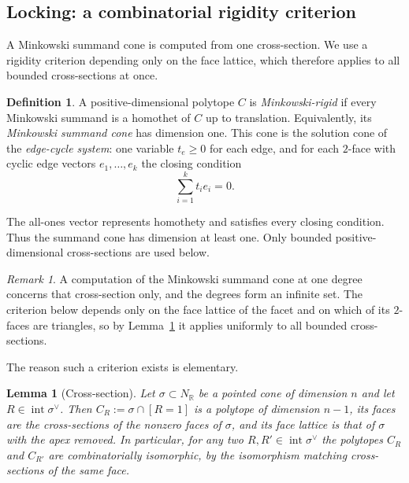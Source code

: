 \documentclass[11pt]{amsart}
\newtheorem{lemma}[theorem]{Lemma}
\theoremstyle{definition}
\newtheorem{definition}[theorem]{Definition}
\theoremstyle{remark}
\newtheorem{remark}[theorem]{Remark}
\theoremstyle{plain}
\newcommand{\RR}{\mathbb{R}}
\begin{document}
\subsection{Locking: a combinatorial rigidity criterion}

A Minkowski summand cone is computed from one cross-section.  We use a
rigidity criterion depending only on the face lattice, which therefore applies
to all bounded cross-sections at once.

\begin{definition}\label{def:rigid}
A positive-dimensional polytope $C$ is \emph{Minkowski-rigid} if every
Minkowski summand is a homothet of $C$ up to translation.  Equivalently,
its \emph{Minkowski summand cone} has dimension one.  This cone is the
solution cone of the \emph{edge-cycle system}: one variable $t_e\ge0$
for each edge, and for each $2$-face with cyclic edge vectors
$e_1,\ldots,e_k$ the closing condition
\begin{equation}\label{eq:closing}
  \sum_{i=1}^k t_i e_i=0.
\end{equation}
\end{definition}

The all-ones vector represents homothety and satisfies every closing
condition.  Thus the summand cone has dimension at least one.
Only bounded positive-dimensional cross-sections are used below.

\begin{remark}\label{rem:dimmoves}
A computation of the Minkowski summand cone at one degree concerns that
cross-section only, and the degrees form an infinite set.  The criterion below
depends only on the face lattice of the facet and on which of its $2$-faces are
triangles, so by Lemma~\ref{lem:crosssection} it applies uniformly to all
bounded cross-sections.
\end{remark}

The reason such a criterion exists is elementary.

\begin{lemma}[Cross-section]\label{lem:crosssection}
Let $\sigma \subset N_\RR$ be a pointed cone of dimension $n$ and let
$R \in \operatorname{int}\sigma^\vee$.  Then $C_R := \sigma \cap [R=1]$ is a
polytope of dimension $n-1$, its faces are the cross-sections of the nonzero
faces of $\sigma$, and its face lattice is that of $\sigma$ with the apex
removed.  In particular, for any two $R, R' \in \operatorname{int}\sigma^\vee$
the polytopes $C_R$ and $C_{R'}$ are combinatorially isomorphic, by the
isomorphism matching cross-sections of the same face.
\end{lemma}
\end{document}
